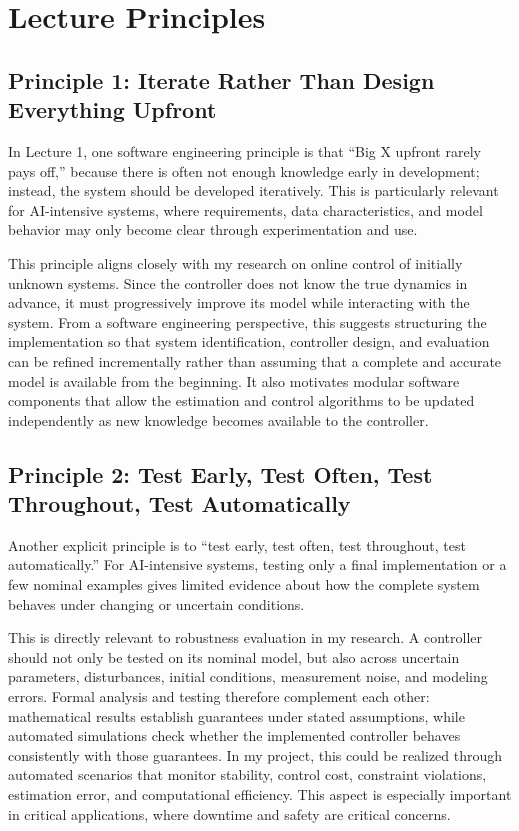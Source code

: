 \documentclass[11pt,a4paper]{article}
\begin{document}
\section{Lecture Principles}


\subsection{Principle 1: Iterate Rather Than Design Everything Upfront}

In Lecture 1, one software engineering principle is that ``Big X upfront rarely pays off,'' because there is often not enough knowledge early in development; instead, the system should be developed iteratively. This is particularly relevant for AI-intensive systems, where requirements, data characteristics, and model behavior may only become clear through experimentation and use.

This principle aligns closely with my research on online control of initially unknown systems. Since the controller does not know the true dynamics in advance, it must progressively improve its model while interacting with the system. From a software engineering perspective, this suggests structuring the implementation so that system identification, controller design, and evaluation can be refined incrementally rather than assuming that a complete and accurate model is available from the beginning. It also motivates modular software components that allow the estimation and control algorithms to be updated independently as new knowledge becomes available to the controller.

\subsection{Principle 2: Test Early, Test Often, Test Throughout, Test Automatically}

Another explicit principle is to ``test early, test often, test throughout, test automatically.'' For AI-intensive systems, testing only a final implementation or a few nominal examples gives limited evidence about how the complete system behaves under changing or uncertain conditions.

This is directly relevant to robustness evaluation in my research. A controller should not only be tested on its nominal model, but also across uncertain parameters, disturbances, initial conditions, measurement noise, and modeling errors. Formal analysis and testing therefore complement each other: mathematical results establish guarantees under stated assumptions, while automated simulations check whether the implemented controller behaves consistently with those guarantees. In my project, this could be realized through automated scenarios that monitor stability, control cost, constraint violations, estimation error, and computational efficiency. This aspect is especially important in critical applications, where downtime and safety are critical concerns.
\end{document}
